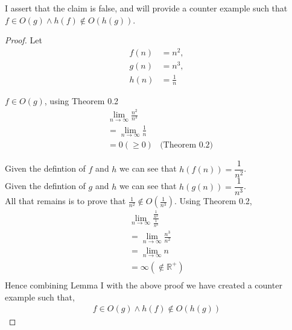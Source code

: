 \documentclass[12pt]{article}
\newcommand{\R}{\mathbb{R}}
\newenvironment{lemma}[2][Lemma]{\begin{trivlist}
\item[\hskip \labelsep {\bfseries #1}\hskip \labelsep {\bfseries #2.}]}{\end{trivlist}}
\newenvironment{question}[2][Question]{\begin{trivlist}
\item[\hskip \labelsep {\bfseries #1}\hskip \labelsep {\bfseries #2.}]}{\end{trivlist}}
\begin{document}
\begin{question}{3}
  I assert that the claim is false, and will provide a counter example such
  that $f \in O(g) \land h(f) \notin O(h(g))$.
  \begin{proof}
    Let
    \begin{align*}
      f(n) &= n^{2},\\
      g(n) &= n^{3},\\
      h(n) &= \frac{1}{n}
    \end{align*}

    \begin{lemma}{I} $f \in O(g)$, using Theorem 0.2
      \begin{align*}
        & \lim_{n\to\infty} \frac{n^{2}}{n^{3}} &  \\
        & = \lim_{n\to\infty} \frac{1}{n}       & \\
        & = 0 (\geq 0)                            & \text{(Theorem 0.2)}
      \end{align*}
    \end{lemma}

    Given the defintion of $f$ and $h$ we can see that $h(f(n)) = \dfrac{1}{n^{2}}$.\\
    Given the defintion of $g$ and $h$ we can see that $h(g(n)) = \dfrac{1}{n^{3}}$.\\
    All that remains is to prove that $\frac{1}{n^{2}}\notin O(\frac{1}{n^{3}})$.  Using Theorem 0.2,
    \begin{align*}
    & \lim_{n\to\infty} \frac{\frac{1}{n^{2}}}{\frac{1}{n^{3}}} &\\
        & = \lim_{n\to\infty} \frac{n^3}{n^2} &\\
        & = \lim_{n\to\infty} n &\\
        & = \infty (\notin \R^{+}) &\\
    \end{align*}
    Hence combining Lemma I with the above proof we have created a counter example
    such that,
    \begin{align*}
      f \in O(g) \land h(f) \notin O(h(g))
    \end{align*}
  \end{proof}
\end{question}
\end{document}
